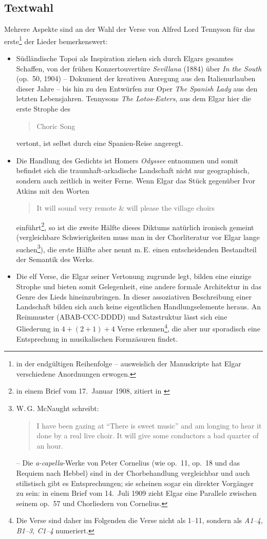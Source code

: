 \documentclass[a4paper,11pt,open=any]{scrbook}
\newcommand{\engquote}[1]{\foreignblockquote{english}{#1}}
\begin{document}
\subsection*{Textwahl}
Mehrere Aspekte sind an der
Wahl der Verse von Alfred Lord Tennyson für das erste\footnote{in der
endgültigen Reihenfolge – ausweislich der Manuskripte hat Elgar
verschiedene Anordnungen erwogen.} der Lieder bemerkenswert:

\begin{itemize}
 \item Südländische Topoi als Inspiration ziehen sich durch Elgars gesamtes
 Schaffen, von der frühen Konzertouvertüre \textit{Sevillana} (1884) über
 \textit{In the South} (op.~50, 1904) – Dokument der kreativen Anregung aus
 den Italienurlauben dieser Jahre – bis hin zu den
 Entwürfen zur Oper \textit{The Spanish Lady} aus den letzten Lebensjahren.
 Tennysons \textit{The Lotos-Eaters}, aus dem Elgar hier die erste Strophe
 des \engquote{Choric Song} vertont,
 ist selbst durch eine Spanien-Reise angeregt\cite[p. 122]{ece13}.

 \item Die Handlung des Gedichts ist Homers \textit{Odyssee} entnommen und
 somit befindet sich die traumhaft-arkadische Landschaft nicht nur geographisch,
 sondern auch zeitlich in weiter Ferne.  Wenn Elgar das Stück gegenüber Ivor
 Atkins mit den Worten \engquote{It will sound very remote \& will please
 the village choirs} einführt\footnote{in einem Brief vom 17.~Januar 1908,
 zitiert in \cite[S.~169]{atkins}}, so ist die zweite Hälfte dieses Diktums
 natürlich ironisch gemeint (vergleichbare Schwierigkeiten muss man in der
 Chorliteratur vor Elgar lange suchen\footnote{W.\,G. McNaught schreibt:
 \engquote{I have been gazing at \enquote{There is sweet music} and am
 longing to hear it done by a real live choir.  It will give some conductors
 a bad quarter of an hour.} \parencite[Bd.~2, S.~693]{elgar-publ} – Die
 \textit{a-capella}-Werke von Peter Cornelius (wie op.~11, op.~18 und das
 Requiem nach Hebbel) sind in der Chorbehandlung vergleichbar und auch
 stilistisch gibt es Entsprechungen; sie scheinen sogar ein direkter
 Vorgänger zu sein: in einem Brief vom 14.~Juli 1909 zieht Elgar eine
 Parallele zwischen seinem op.~57 und Chorliedern von Cornelius.}), die
 erste Hälfte aber nennt m.\,E. einen entscheidenden Bestandteil der
 Semantik des Werks.

 \item Die elf Verse, die Elgar seiner Vertonung zugrunde legt, bilden eine
 einzige Strophe und bieten somit Gelegenheit, eine andere formale
 Architektur in das Genre des Lieds hineinzubringen.  In dieser assoziativen
 Beschreibung einer Landschaft bilden sich auch keine eigentlichen
 Handlungselemente heraus.  An Reimmuster (ABAB-CCC-DDDD) und Satzstruktur
 lässt sich eine Gliederung in $4+(2+1)+4$ Verse erkennen\footnote{Die Verse
 sind daher im Folgenden die Verse nicht als 1–11, sondern als \textit{A1–4,
 B1–3, C1–4} numeriert.}, die aber nur sporadisch eine Entsprechung in
 musikalischen Formzäsuren findet.


\end{itemize}
\end{document}
